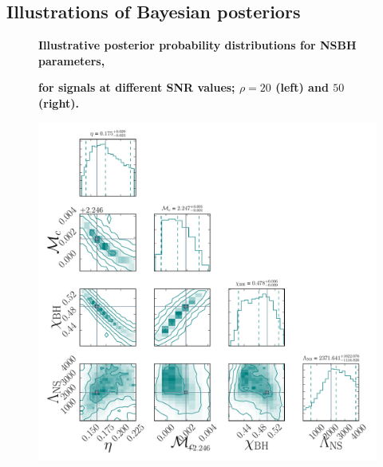\documentclass[aps,prd,amsmath,floats,floatfix, twocolumn,
superscriptaddress,nofootinbib,showpacs]{revtex4-1}
\begin{document}
\begin{appendix}
\section{Illustrations of Bayesian posteriors}\label{as1:illustrations}
% 
\begin{figure}
\centering
\textbf{Illustrative posterior probability distributions for NSBH parameters,}\par
\textbf{for signals at different SNR values; $\rho = 20$ (left) and $50$ (right).}\par\medskip
\includegraphics[width=1.05\columnwidth,trim=2cm 0 0 0]{plots/AllParamsMcEtPDF1D2D_q4_mc2_25_chi0_50_snr20}%

\end{figure}
\end{appendix}
\end{document}
